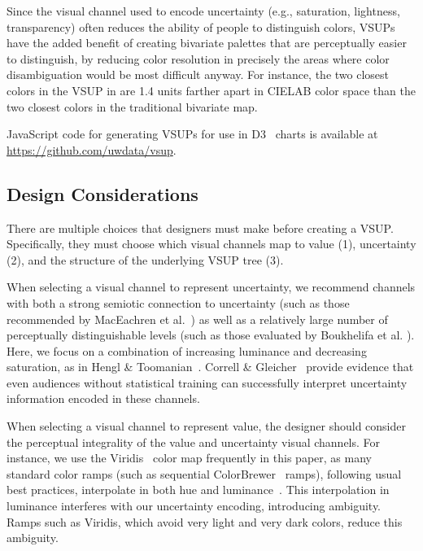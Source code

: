 Since the visual channel used to encode uncertainty (e.g., saturation, lightness, transparency) often reduces the ability of people to distinguish colors, VSUPs have the added benefit of creating bivariate palettes that are perceptually easier to distinguish, by reducing color resolution in precisely the areas where color disambiguation would be most difficult anyway. For instance, the two closest colors in the VSUP in  are 1.4 units farther apart in CIELAB color space than the two closest colors in the traditional bivariate map.

JavaScript code for generating VSUPs for use in D3~\cite{bostock2011d3} charts is available at \url{https://github.com/uwdata/vsup}.

\subsection{Design Considerations}

There are multiple choices that designers must make before creating a VSUP. Specifically, they must choose which visual channels map to value (1), uncertainty (2), and the structure of the underlying VSUP tree (3).

When selecting a visual channel to represent uncertainty, we recommend channels with both a strong semiotic connection to uncertainty (such as those recommended by MacEachren et al.~\cite{maceachren2012visual}) as well as a relatively large number of perceptually distinguishable levels (such as those evaluated by Boukhelifa et al. \cite{boukhelifa2012evaluating}). Here, we focus on a combination of increasing luminance and decreasing saturation, as in Hengl \& Toomanian~\cite{hengl2006maps}. Correll \& Gleicher~\cite{correll2014error} provide evidence that even audiences without statistical training can successfully interpret uncertainty information encoded in these channels.

When selecting a visual channel to represent value, the designer should consider the perceptual integrality of the value and uncertainty visual channels. For instance, we use the Viridis~\cite{viridis} color map frequently in this paper, as many standard color ramps (such as sequential ColorBrewer~\cite{harrower2003colorbrewer} ramps), following usual best practices, interpolate in both hue and luminance~\cite{ware1988color}. This interpolation in luminance interferes with our uncertainty encoding, introducing ambiguity. Ramps such as Viridis, which avoid very light and very dark colors, reduce this ambiguity.

